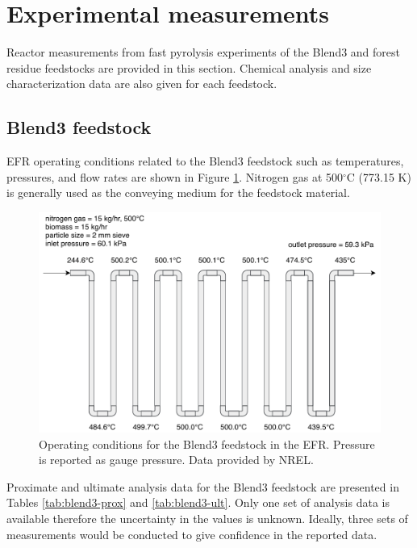 
\section{Experimental measurements}

Reactor measurements from fast pyrolysis experiments of the Blend3 and forest residue feedstocks are provided in this section. Chemical analysis and size characterization data are also given for each feedstock.

\subsection{Blend3 feedstock}

EFR operating conditions related to the Blend3 feedstock such as temperatures, pressures, and flow rates are shown in Figure \ref{fig:efr-blend3}. Nitrogen gas at 500$^{\circ}$C (773.15 K) is generally used as the conveying medium for the feedstock material.

\begin{figure}[H]
    \centering
    \includegraphics[width=\textwidth]{figures/efr-blend3.pdf}
    \caption{Operating conditions for the Blend3 feedstock in the EFR. Pressure is reported as gauge pressure. Data provided by NREL.}
    \label{fig:efr-blend3}
\end{figure}

Proximate and ultimate analysis data for the Blend3 feedstock are presented in Tables \ref{tab:blend3-prox} and \ref{tab:blend3-ult}. Only one set of analysis data is available therefore the uncertainty in the values is unknown. Ideally, three sets of measurements would be conducted to give confidence in the reported data.

